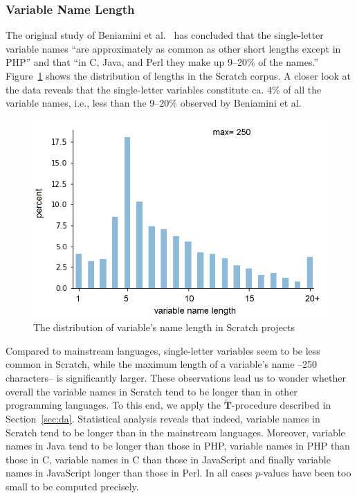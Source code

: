 \documentclass[conference]{IEEEtran}
\begin{document}
\subsubsection{Variable Name Length}
\label{res:var:length}
The original study of Beniamini et al.~\cite{Beniamini} has concluded that the single-letter variable names ``are approximately as common as other short lengths except in PHP'' and that  ``in C, Java, and Perl they make up 9--20\% of the names.'' 
Figure~\ref{fig:distribution_of_lengths} shows the distribution of lengths in the Scratch corpus. A closer look at the data reveals that the single-letter variables constitute ca. 4\% of all the variable names, i.e., less than the 9--20\% observed by Beniamini et al.
\begin{figure}[tb]
	\begin{center}
		\includegraphics[width=\columnwidth]{fig/project/distribution_var_name_length}
		\caption{The distribution of variable's name length in Scratch projects}
		\label{fig:distribution_of_lengths}
	\end{center}
\end{figure} 
Compared to mainstream languages, single-letter variables seem to be less common in Scratch, while the maximum length of a variable's name --250 characters-- is significantly larger. 
These observations lead us to wonder whether overall the variable names in Scratch tend to be longer than in other programming languages.
To this end, we apply the $\widetilde{\mathbf{T}}$-procedure described in Section~\ref{sec:da}. 
Statistical analysis reveals that indeed, variable names in Scratch tend to be longer than in the mainstream languages.
Moreover, variable names in Java tend to be longer than those in PHP, variable names in  PHP than those in C, variable names in C than those in JavaScript and finally variable names in JavaScript longer than those in Perl. In all cases $p$-values have been too small to be computed precisely.
\end{document}
